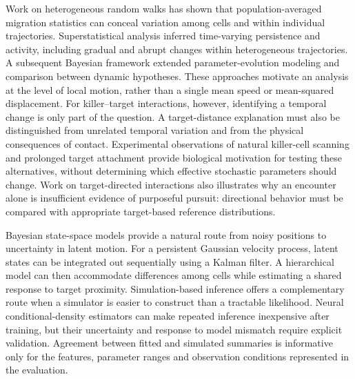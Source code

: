\documentclass[12pt]{article}
\begin{document}
Work on heterogeneous random walks has shown that population-averaged migration statistics can conceal variation among cells and within individual trajectories. Superstatistical analysis inferred time-varying persistence and activity, including gradual and abrupt changes within heterogeneous trajectories\citep{metzner2015}. A subsequent Bayesian framework extended parameter-evolution modeling and comparison between dynamic hypotheses\citep{mark2018}. These approaches motivate an analysis at the level of local motion, rather than a single mean speed or mean-squared displacement. For killer--target interactions, however, identifying a temporal change is only part of the question. A target-distance explanation must also be distinguished from unrelated temporal variation and from the physical consequences of contact. Experimental observations of natural killer-cell scanning and prolonged target attachment provide biological motivation for testing these alternatives, without determining which effective stochastic parameters should change\citep{olofsson2014}. Work on target-directed interactions also illustrates why an encounter alone is insufficient evidence of purposeful pursuit: directional behavior must be compared with appropriate target-based reference distributions\citep{metzner2021}.

Bayesian state-space models provide a natural route from noisy positions to uncertainty in latent motion. For a persistent Gaussian velocity process, latent states can be integrated out sequentially using a Kalman filter\citep{kalman1960}. A hierarchical model can then accommodate differences among cells while estimating a shared response to target proximity. Simulation-based inference offers a complementary route when a simulator is easier to construct than a tractable likelihood\citep{cranmer2020,papamakarios2016}. Neural conditional-density estimators can make repeated inference inexpensive after training, but their uncertainty and response to model mismatch require explicit validation\citep{lueckmann2021}. Agreement between fitted and simulated summaries is informative only for the features, parameter ranges and observation conditions represented in the evaluation.
\end{document}

